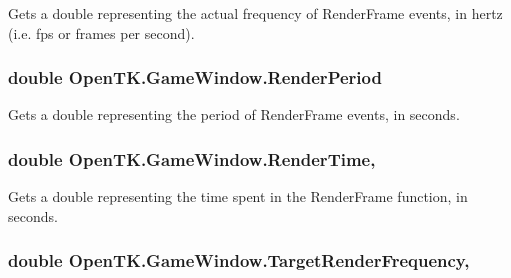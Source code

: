 Gets a double representing the actual frequency of Render\-Frame events, in hertz (i.\-e. fps or frames per second). 

\hypertarget{class_open_t_k_1_1_game_window_aad1395cb550c3eea673b447c84990c2c}{
\subsubsection[{Render\-Period}]{\setlength{\rightskip}{0pt plus 5cm}double Open\-T\-K.\-Game\-Window.\-Render\-Period\hspace{0.3cm}{\ttfamily [get]}}}\label{class_open_t_k_1_1_game_window_aad1395cb550c3eea673b447c84990c2c}


Gets a double representing the period of Render\-Frame events, in seconds. 

\hypertarget{class_open_t_k_1_1_game_window_a1462d45526351e92b948f0b329c77d56}{
\subsubsection[{Render\-Time}]{\setlength{\rightskip}{0pt plus 5cm}double Open\-T\-K.\-Game\-Window.\-Render\-Time\hspace{0.3cm}{\ttfamily [get]}, {\ttfamily [set]}}}\label{class_open_t_k_1_1_game_window_a1462d45526351e92b948f0b329c77d56}


Gets a double representing the time spent in the Render\-Frame function, in seconds. 

\hypertarget{class_open_t_k_1_1_game_window_ae604e886eca5028a0d2252bf6d52434a}{
\subsubsection[{Target\-Render\-Frequency}]{\setlength{\rightskip}{0pt plus 5cm}double Open\-T\-K.\-Game\-Window.\-Target\-Render\-Frequency\hspace{0.3cm}{\ttfamily [get]}, {\ttfamily [set]}}}\label{class_open_t_k_1_1_game_window_ae604e886eca5028a0d2252bf6d52434a}



